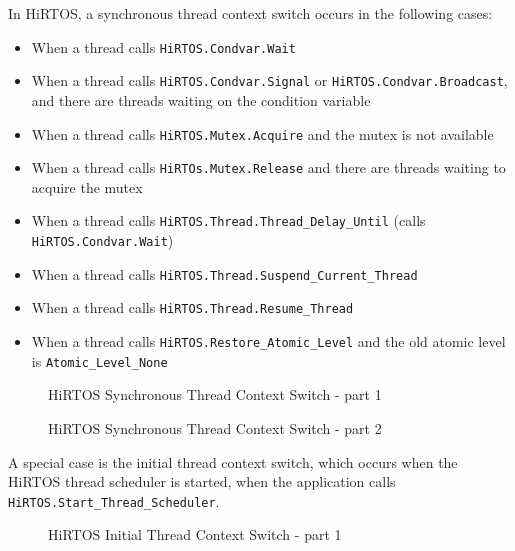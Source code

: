 \documentclass[11pt,letterpaper,twoside,openany]{book}
\begin{document}
In HiRTOS, a synchronous thread context switch occurs in the following cases:
\begin{itemize}
\item When a thread calls \verb`HiRTOS.Condvar.Wait`
\item When a thread calls \verb`HiRTOS.Condvar.Signal` or \verb`HiRTOS.Condvar.Broadcast`,
      and there are threads waiting on the condition variable
\item When a thread calls \verb`HiRTOS.Mutex.Acquire` and the mutex is not available
\item When a thread calls \verb`HiRTOs.Mutex.Release` and there are threads waiting
      to acquire the mutex
\item When a thread calls \verb`HiRTOS.Thread.Thread_Delay_Until` (calls \verb`HiRTOS.Condvar.Wait`)
\item When a thread calls \verb`HiRTOS.Thread.Suspend_Current_Thread`
\item When a thread calls \verb`HiRTOS.Thread.Resume_Thread`
\item When a thread calls \verb`HiRTOS.Restore_Atomic_Level` and the old atomic level is
      \verb`Atomic_Level_None`
\end{itemize}

\begin{figure}[H]
   \centering
   \scalebox{0.40} {
      
   }
   \caption{HiRTOS Synchronous Thread Context Switch - part 1}
   \label{HiRTOSumlSeqDiagram3}
\end{figure}

\begin{figure}[H]
   \centering
   \scalebox{0.40} {
      
   }
   \caption{HiRTOS Synchronous Thread Context Switch - part 2}
   \label{HiRTOSumlSeqDiagram4}
\end{figure}

A special case is the initial thread context switch, which occurs when the
HiRTOS thread scheduler is started, when the application calls
\verb`HiRTOS.Start_Thread_Scheduler`.

\begin{figure}[H]
   \centering
   \scalebox{0.40} {
      
   }
   \caption{HiRTOS Initial Thread Context Switch - part 1}
   \label{HiRTOSumlSeqDiagram5}
\end{figure}
\end{document}

